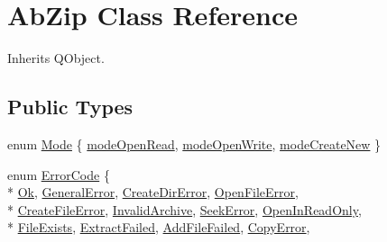 \hypertarget{class_ab_zip}{}\section{Ab\+Zip Class Reference}
\label{class_ab_zip}


Inherits Q\+Object.

\subsection*{Public Types}
\begin{DoxyCompactItemize}
\item 
enum \hyperlink{class_ab_zip_ad24114feac0d38566f6b36f5fc0db54e}{Mode} \{ \hyperlink{class_ab_zip_ad24114feac0d38566f6b36f5fc0db54eab1422ad58f4dcd50cff8ce563ec8a806}{mode\+Open\+Read}, 
\hyperlink{class_ab_zip_ad24114feac0d38566f6b36f5fc0db54eacf5b3a4319c2d25e81ba95bef0ac3041}{mode\+Open\+Write}, 
\hyperlink{class_ab_zip_ad24114feac0d38566f6b36f5fc0db54ea9c1fc83e455d4baf3dacee9e691616b8}{mode\+Create\+New}
 \}
\item 
enum \hyperlink{class_ab_zip_ac669c2fce0fbde75677d12711c11c504}{Error\+Code} \{ \\*
\hyperlink{class_ab_zip_ac669c2fce0fbde75677d12711c11c504a897b2aeaa63e2e2be4464b795017c971}{Ok}, 
\hyperlink{class_ab_zip_ac669c2fce0fbde75677d12711c11c504a5c47b45f7cef73c6e14a9e5e7d2108b6}{General\+Error}, 
\hyperlink{class_ab_zip_ac669c2fce0fbde75677d12711c11c504ad2e454eab3290b12e6a0dd81374d6cc7}{Create\+Dir\+Error}, 
\hyperlink{class_ab_zip_ac669c2fce0fbde75677d12711c11c504a0d8a3def87960152f44da3aea842e99f}{Open\+File\+Error}, 
\\*
\hyperlink{class_ab_zip_ac669c2fce0fbde75677d12711c11c504aa084f0a8084c9602eea2ab75bc10ede9}{Create\+File\+Error}, 
\hyperlink{class_ab_zip_ac669c2fce0fbde75677d12711c11c504ace462f90eb1cedae9a3c57ab06048b1c}{Invalid\+Archive}, 
\hyperlink{class_ab_zip_ac669c2fce0fbde75677d12711c11c504a501e9909cf9ff21a190916fa9ba04d24}{Seek\+Error}, 
\hyperlink{class_ab_zip_ac669c2fce0fbde75677d12711c11c504a67c493072811f65bc610ba548c1a58c7}{Open\+In\+Read\+Only}, 
\\*
\hyperlink{class_ab_zip_ac669c2fce0fbde75677d12711c11c504abf9ead9668e2736dabaf19715a34b91e}{File\+Exists}, 
\hyperlink{class_ab_zip_ac669c2fce0fbde75677d12711c11c504afd59228859ee6670b7ecd0c4c59db347}{Extract\+Failed}, 
\hyperlink{class_ab_zip_ac669c2fce0fbde75677d12711c11c504a75a9dbed21bb60a9b71c8334ad48fe01}{Add\+File\+Failed}, 
\hyperlink{class_ab_zip_ac669c2fce0fbde75677d12711c11c504af1834b62bfacbc694454951991db07d8}{Copy\+Error}, 

\end{DoxyCompactItemize}
